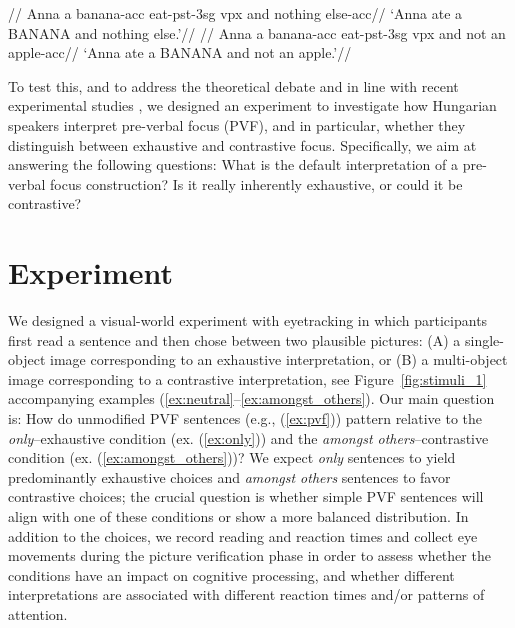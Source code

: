 \documentclass[ruler]{CUP-JNL-LIN}%
\begin{document}
\pex[everygla={},aboveglftskip=0em,interpartskip=0em]
\label{ex:pvf_full}
\a \begingl \label{ex:pvf_nothing}
//
\glb Anna{\sc [nom]} a banana-{\sc acc} eat-{\sc pst-3sg} {\sc vpx} and nothing else-{\sc acc}//
\glft `Anna ate a BANANA and nothing else.'//
\endgl
\a \begingl \label{ex:pvf_not_something}
//
\glb Anna{\sc [nom]} a banana-{\sc acc} eat-{\sc pst-3sg} {\sc vpx} and not an apple-{\sc acc}//
\glft `Anna ate a BANANA and not an apple.'//
\endgl
\xe

To test this, and to address the theoretical debate and in line with recent experimental studies \citep{onea_2009_hungarian,gerocs_2014_exhaustivity,kaldi_2018_linguistic,kaldi_2021_hungarian_structural}, we designed an experiment to investigate how Hungarian speakers interpret pre-verbal focus (PVF), and in particular, whether they distinguish between exhaustive and contrastive focus. Specifically, we aim at answering the following questions: What is the default interpretation of a pre-verbal focus construction? Is it really inherently exhaustive, or could it be contrastive?



\section{Experiment}

We designed a visual-world experiment with eyetracking in which participants first read a sentence and then chose between two plausible pictures: (A) a single-object image corresponding to an exhaustive interpretation, or (B) a multi-object image corresponding to a contrastive interpretation, see Figure~\ref{fig:stimuli_1} accompanying examples (\ref{ex:neutral}--\ref{ex:amongst_others}). Our main question is: How do unmodified PVF sentences (e.g., (\ref{ex:pvf})) pattern relative to the \textit{only}--exhaustive condition (ex. (\ref{ex:only})) and the \textit{amongst others}--contrastive condition (ex. (\ref{ex:amongst_others}))? We expect \textit{only} sentences to yield predominantly exhaustive choices and \textit{amongst others} sentences to favor contrastive choices; the crucial question is whether simple PVF sentences will align with one of these conditions or show a more balanced distribution. 
In addition to the choices, we record reading and reaction times and collect eye movements during the picture verification phase in order to assess whether the conditions have an impact on cognitive processing, and whether different interpretations are associated with different reaction times and/or patterns of attention. 
\end{document}
